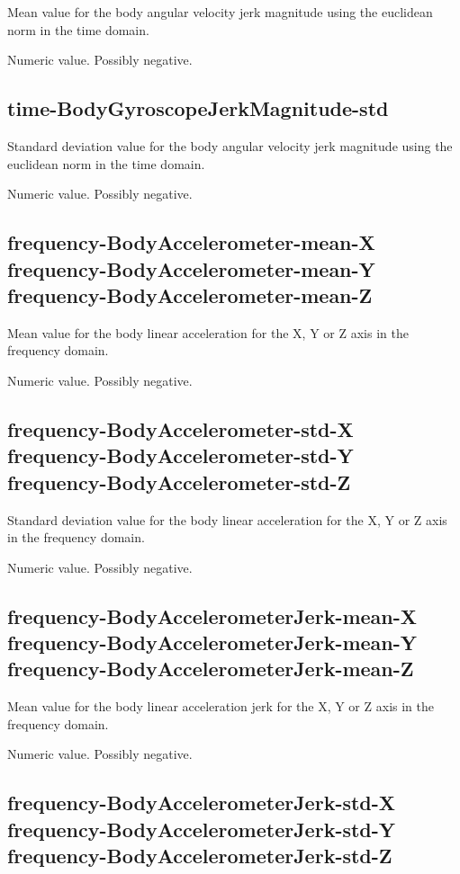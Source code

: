 \documentclass[a4paper,10pt]{report}
\begin{document}
Mean value for the body angular velocity jerk magnitude using the euclidean norm in the time domain.

Numeric value. Possibly negative.

\subsection*{time-BodyGyroscopeJerkMagnitude-std} 

Standard deviation value for the body angular velocity jerk magnitude using the euclidean norm in the time domain.

Numeric value. Possibly negative.

\subsection*{frequency-BodyAccelerometer-mean-X\\frequency-BodyAccelerometer-mean-Y\\frequency-BodyAccelerometer-mean-Z} 

Mean value for the body linear acceleration for the X, Y or Z axis in the frequency domain.

Numeric value. Possibly negative.

\subsection*{frequency-BodyAccelerometer-std-X\\frequency-BodyAccelerometer-std-Y\\frequency-BodyAccelerometer-std-Z} 

Standard deviation value for the body linear acceleration for the X, Y or Z axis in the frequency domain.

Numeric value. Possibly negative.

\subsection*{frequency-BodyAccelerometerJerk-mean-X\\frequency-BodyAccelerometerJerk-mean-Y\\frequency-BodyAccelerometerJerk-mean-Z} 

Mean value for the body linear acceleration jerk for the X, Y or Z axis in the frequency domain.

Numeric value. Possibly negative.

\subsection*{frequency-BodyAccelerometerJerk-std-X\\frequency-BodyAccelerometerJerk-std-Y\\frequency-BodyAccelerometerJerk-std-Z} 
\end{document}
